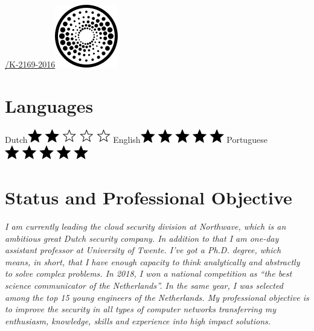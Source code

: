 \documentclass[print]{styles/friggeri-cv-linux} %
\begin{document}
\begin{aside}
\href{http://www.researcherid.com/rid/K-2169-2016}{/K-2169-2016}\includegraphics[scale=0.3]{img/researchid.png}
~
\section{Languages}
Dutch\includegraphics[scale=0.40]{img/2stars.png}
English\includegraphics[scale=0.40]{img/5stars.png}
Portuguese\includegraphics[scale=0.40]{img/5stars.png}
\end{aside}

\section{Status and Professional Objective}\vspace{-10pt}
\noindent\setlength\parindent{12pt}\textit{
	I am currently leading the cloud security division at Northwave, which is an ambitious great Dutch security company.
	In addition to that I am one-day assistant professor at University of Twente. 
	I've got a Ph.D. degree, which means, in short, that I have enough capacity to think analytically and abstractly to solve complex problems. 
	In 2018, I won a national competition as ``the best science communicator of 
	the Netherlands''. In the same year, I was selected among the top 15 young engineers of the Netherlands.
	My professional objective is to improve the security in all types of computer networks transferring my enthusiasm, knowledge, skills and experience into high impact solutions. 
}
\end{document}
